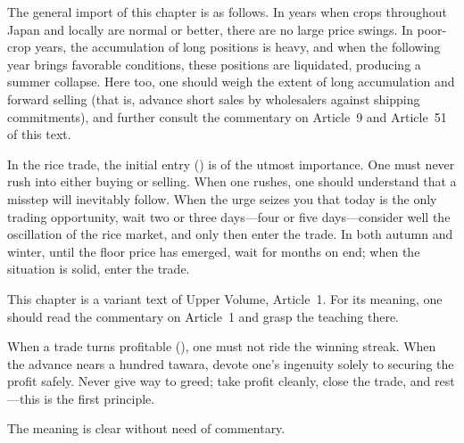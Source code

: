 \commentary
The general import of this chapter is as follows. In years when crops
throughout Japan and locally are normal or better, there are no large price
swings. In poor-crop years, the accumulation of long positions is heavy,
and when the following year brings favorable conditions, these positions are
liquidated, producing a summer collapse. Here too, one should weigh the
extent of long accumulation and forward selling (that is, advance short
sales by wholesalers against shipping commitments), and further consult the
commentary on Article~9 and Article~51 of this text.


\begin{sokyubox}
{\small\itshape\color{sokyubar} }

\medskip
In the rice trade, the initial entry () is of the
utmost importance. One must never rush into either buying or selling. When
one rushes, one should understand that a misstep will inevitably follow.
When the urge seizes you that today is the only trading opportunity, wait
two or three days---four or five days---consider well the oscillation of
the rice market, and only then enter the trade. In both autumn and winter,
until the floor price has emerged, wait for months on end; when the
situation is solid, enter the trade.
\end{sokyubox}

\commentary
This chapter is a variant text of Upper Volume, Article~1. For its meaning,
one should read the commentary on Article~1 and grasp the teaching there.


\begin{sokyubox}
{\small\itshape\color{sokyubar} }

\medskip
When a trade turns profitable (), one must not ride the
winning streak. When the advance nears a hundred tawara, devote one's
ingenuity solely to securing the profit safely. Never give way to greed;
take profit cleanly, close the trade, and rest---this is the first
principle.
\end{sokyubox}

\commentary
The meaning is clear without need of commentary.


